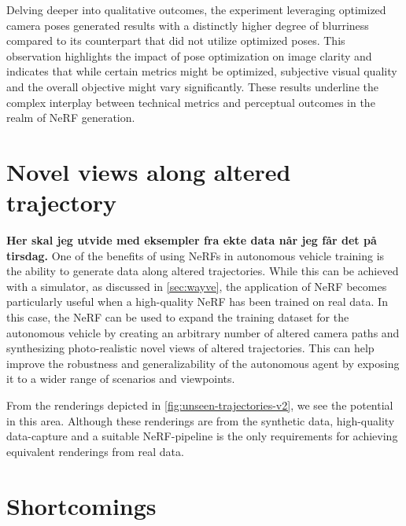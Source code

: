 Delving deeper into qualitative outcomes, the experiment leveraging optimized camera poses generated results with a distinctly higher degree of blurriness compared to its counterpart that did not utilize optimized poses. This observation highlights the impact of pose optimization on image clarity and indicates that while certain metrics might be optimized, subjective visual quality and the overall objective might vary significantly. These results underline the complex interplay between technical metrics and perceptual outcomes in the realm of NeRF generation.

\begin{comment}
- The estimation could be further improved by investigating techniques for leveraging more of the contained data.
- The NAPLab car's accelerometer could be used to calculate roll and pitch.
- LiDAR data could be used for further pose estimation
\end{comment}





\section{Novel views along altered trajectory}
\textbf{Her skal jeg utvide med eksempler fra ekte data når jeg får det på tirsdag.}
One of the benefits of using NeRFs in autonomous vehicle training is the ability to generate data along altered trajectories. While this can be achieved with a simulator, as discussed in \autoref{sec:wayve}, the application of NeRF becomes particularly useful when a high-quality NeRF has been trained on real data. In this case, the NeRF can be used to expand the training dataset for the autonomous vehicle by creating an arbitrary number of altered camera paths and synthesizing photo-realistic novel views of altered trajectories. This can help improve the robustness and generalizability of the autonomous agent by exposing it to a wider range of scenarios and viewpoints.

From the renderings depicted in \autoref{fig:unseen-trajectories-v2}, we see the potential in this area. Although these renderings are from the synthetic data, high-quality data-capture and a suitable NeRF-pipeline is the only requirements for achieving equivalent renderings from real data.




\section{Shortcomings}

